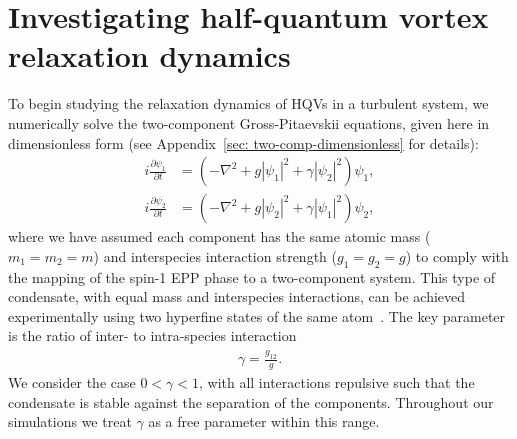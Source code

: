 \section{Investigating half-quantum vortex relaxation dynamics}
To begin studying the relaxation dynamics of HQVs in a turbulent system, we
numerically solve the two-component Gross-Pitaevskii equations, given here in
dimensionless form (see Appendix~\ref{sec: two-comp-dimensionless} for details):
\begin{equation}\label{eq: dimensionless-two-comp-GPEs}
    \begin{aligned}
        i\frac{\partial \psi_1}{\partial t} & = (-\nabla^2 + g|\psi_1|^2
        + \gamma|\psi_2|^2)\psi_1,                                       \\
        i\frac{\partial \psi_2}{\partial t} & = (-\nabla^2 + g|\psi_2|^2
        + \gamma|\psi_1|^2)\psi_2,
    \end{aligned}
\end{equation}
where we have assumed each component has the same atomic mass (\(m_1=m_2=m\))
and interspecies interaction strength (\(g_1=g_2=g\)) to comply with the mapping
of the spin-1 EPP phase to a two-component system.
This type of condensate, with equal mass and interspecies interactions, can be
achieved experimentally using two hyperfine states of the same
atom~\cite{Myatt1997, Hall1998}.
The key parameter is the ratio of inter- to intra-species interaction
\begin{align}
    \gamma = \frac{g_{12}}{g}.
\end{align}
We consider the case \(0 < \gamma < 1\), with all interactions repulsive such
that the condensate is stable against the separation of the components.
Throughout our simulations we treat \(\gamma\) as a free parameter within this
range.

